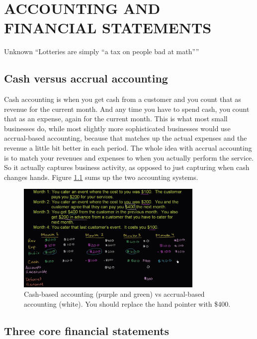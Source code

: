 \chapter{ACCOUNTING AND FINANCIAL STATEMENTS}
\begin{chapquote}{Unknown}
``Lotteries are simply “a tax on people bad at math”''
\end{chapquote}

\section{Cash versus accrual accounting}
Cash accounting is when you get cash from a customer and you count that as revenue for the current month. And any time you have to spend cash, you count that as an expense, again for the current month. This is what most small businesses do, while most slightly more sophisticated businesses would use accrual-based accounting, because that matches up the actual expenses and the revenue a little bit better in each period. 
The whole idea with accrual accounting is to match your revenues and expenses to when you actually perform the service. So it actually captures business activity, as opposed to just capturing when cash changes hands. Figure \ref{fig:cashVSaccrual} sums up the two accounting systems.

\begin{figure}[h!]
\centering
\includegraphics[width=0.8\textwidth]{images/cashVSaccrual.png}
\caption{Cash-based accounting (purple and green) vs accrual-based accounting (white). You should replace the hand pointer with \$400.}
\label{fig:cashVSaccrual}
\end{figure}

\section{Three core financial statements}

